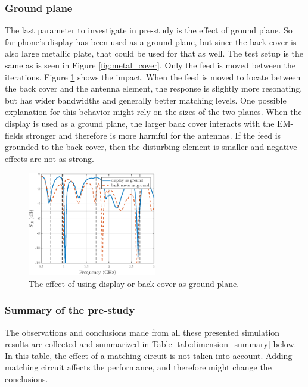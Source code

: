 \subsubsection{Ground plane}
\label{sec:ground_plane}
The last parameter to investigate in pre-study is the effect of ground plane. So far phone's display has been used as a ground plane, but since the back cover is also large metallic plate, that could be used for that as well. The test setup is the same as is seen in Figure \ref{fig:metal_cover}. Only the feed is moved between the iterations. Figure \ref{fig:ground_plane} shows the impact. When the feed is moved to locate between the back cover and the antenna element, the response is slightly more resonating, but has wider bandwidths and generally better matching levels. One possible explanation for this behavior might rely on the sizes of the two planes. When the display is used as a ground plane, the larger back cover interacts with the EM-fields stronger and therefore is more harmful for the antennas. If the feed is grounded to the back cover, then the disturbing element is smaller and negative effects are not as strong.

\begin{figure}[H]
    \centering
    \includegraphics[width=0.5\textwidth]{img/ground_vs_display.eps}
    \caption{The effect of using display or back cover as ground plane.}
    \label{fig:ground_plane}
\end{figure}

\subsubsection{Summary of the pre-study}
\label{sec:pre_study_summary}
The observations and conclusions made from all these presented simulation results are collected and summarized in Table \ref{tab:dimension_summary} below. In this table, the effect of a matching circuit is not taken into account. Adding matching circuit affects the performance, and therefore might change the conclusions.

